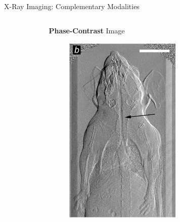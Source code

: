 \documentclass[
 ]{beamer}%
\begin{document}
\begin{frame}{X-Ray Imaging: Complementary Modalities}
\begin{columns}
\begin{column}{.315\textwidth}
\begin{figure}[ht]
                \scriptsize\cite{Bech2013}
            \end{figure}
        \end{column}
        \begin{column}{.315\textwidth}
            \textbf{Phase-Contrast} Image
            \begin{figure}[ht]
                \centering
                \includegraphics[width=0.63\textwidth]{images/XRay_Phase_Contrast.jpg}
                

\end{figure}
\end{column}
\end{columns}
\end{frame}
\end{document}
